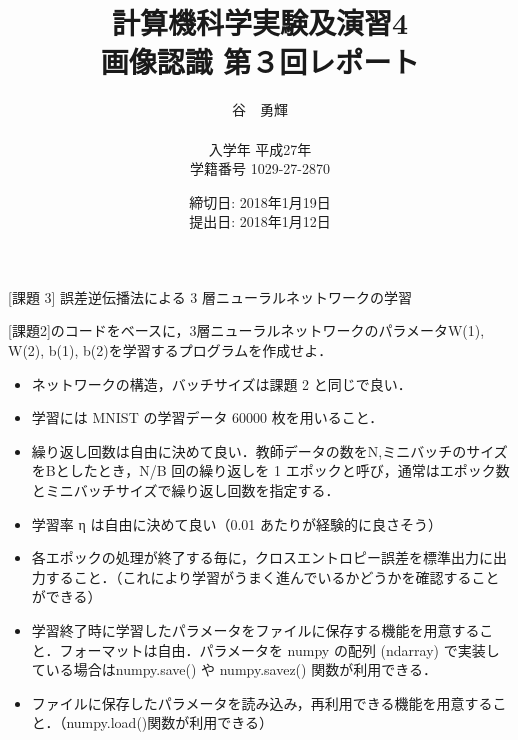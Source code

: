 \documentclass{ujarticle} %
\begin{document}
\title{計算機科学実験及演習4 \\ \bf 画像認識 第３回レポート}
\author{谷　勇輝 \\ \\入学年 平成27年 \\ 学籍番号 1029-27-2870}
\date{締切日: 2018年1月19日\\ 提出日: 2018年1月12日}
\maketitle
\newpage


\begin{itembox}[l]{[課題 3] 誤差逆伝播法による 3 層ニューラルネットワークの学習}

[課題2]のコードをベースに，3層ニューラルネットワークのパラメータW(1), W(2), b(1), b(2)を学習するプログラムを作成せよ．

\begin{itemize}
  \item ネットワークの構造，バッチサイズは課題 2 と同じで良い．
  \item 学習には MNIST の学習データ 60000 枚を用いること．
  \item 繰り返し回数は自由に決めて良い．教師データの数をN,ミニバッチのサイズをBとしたとき，N/B 回の繰り返しを 1 エポックと呼び，通常はエポック数とミニバッチサイズで繰り返し回数を指定する．
  \item 学習率 η は自由に決めて良い（0.01 あたりが経験的に良さそう）
  \item 各エポックの処理が終了する毎に，クロスエントロピー誤差を標準出力に出力すること．（これにより学習がうまく進んでいるかどうかを確認することができる）
  \item 学習終了時に学習したパラメータをファイルに保存する機能を用意すること．フォーマットは自由．パラメータを numpy の配列 (ndarray) で実装している場合はnumpy.save() や numpy.savez() 関数が利用できる．
  \item ファイルに保存したパラメータを読み込み，再利用できる機能を用意すること．（numpy.load()関数が利用できる）
\end{itemize}

\end{itembox}
\end{document}
